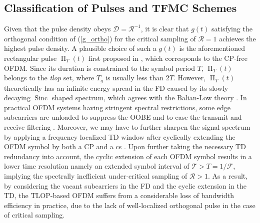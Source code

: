 \documentclass[journal]{IEEEtran}
\DeclareMathOperator{\sinc}{Sinc}
\DeclareMathOperator{\rect}{\Pi}
\begin{document}
\subsection{Classification of Pulses and TFMC Schemes}\label{unload_subcarrier}

Given that the pulse density obeys $\mathcal D=\mathcal R^{-1}$, it is clear that $g(t)$ satisfying the orthogonal condition of (\ref{g_ortho}) for the critical sampling of $\mathcal R=1$ achieves the highest pulse density.
A plausible choice of such a $g(t)$ is the aforementioned rectangular pulse $\rect_T(t)$ first proposed in \cite{toiotf_harmuth_60}, which corresponds to the CP-free OFDM. Since its duration is constrained to the symbol period $T$,  $\rect_T(t)$ belongs to the \emph{\ac{tlop}} set\cite{tlomcm_95}, where $T_g$ is usually less than $2T$. {However, $\rect_T(t)$ theoretically has an infinite energy spread in the FD caused by its slowly decaying $\sinc$ shaped spectrum}, which agrees with the Balian-Low theory \cite{wavelet_book}.
In practical OFDM systems having stringent spectral restrictions, some edge subcarriers are unloaded to suppress the OOBE and to ease the transmit and receive filtering \cite{80211a,80211ac,3gpp_4g}.
Moreover, we may have to further sharpen the signal spectrum by applying a frequency localized TD window after cyclically extending the OFDM symbol by both a CP and a \ac{cs} \cite{mallory_92,tlomcm_95,80211a,80211ac,rcwofdm,wola,waveformcandidate}. Upon further taking the necessary TD redundancy into account, the cyclic extension of each OFDM symbol results in a lower time resolution namely an extended symbol interval of $\mathcal T> T=1/\mathcal F$, implying the spectrally inefficient under-critical sampling of $\mathcal R >1$. As a result, by considering the vacant  subcarriers in the FD and the cyclic extension in the TD, the TLOP-based OFDM suffers from a considerable loss of bandwidth efficiency in practice, due to the lack of well-localized orthogonal pulse in the case of critical sampling.
\end{document}
